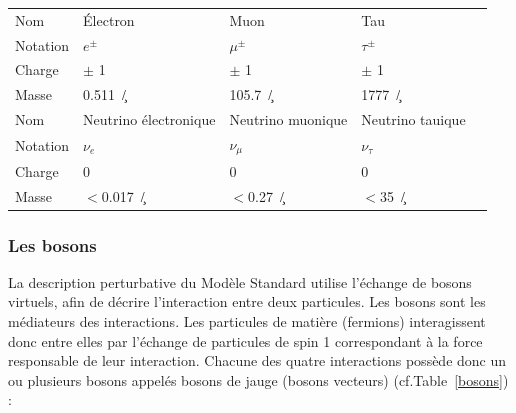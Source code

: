\begin{table}[H]
\begin{tabular}{|O|O|O|O|N}
		\hline
		 Nom &  Électron &  Muon &  Tau \\
		 Notation &  $e^{\pm}$ &  $\mu^{\pm}$ &  $\tau^{\pm}$ \\
		 Charge &  $\pm$ \num{1} &  $\pm$ \num{1} &  $\pm$ \num{1} \\
		 Masse &  \SI{0.511}{\mega\eV/\square\c} &  \SI{105.7}{\mega\eV/\square\c}&  \SI{1777}{\giga\eV/\square\c} \\
		\hline 
		 Nom &  Neutrino électronique &  Neutrino muonique &  Neutrino tauique \\
		 Notation &  $\nu_{e}$ &  $\nu_{\mu}$ &  $\nu_{\tau}$ \\
		 Charge &  \num{0} &  \num{0} &  \num{0} \\
		 Masse &  $<$\SI{0.017}{\mega\eV/\square\c} & $<$\SI{0.27}{\mega\eV/\square\c}  & $<$\SI{35}{\mega\eV/\square\c}\\
	\hline
\end{tabular} 
\label{fermions}
\end{table}	

\subsubsection{Les bosons}
La description perturbative du Modèle Standard utilise l'échange de bosons virtuels, afin de décrire l'interaction entre deux particules. Les bosons sont les médiateurs des interactions. Les particules de matière (fermions) interagissent donc entre elles par l'échange de particules de spin \num{1} correspondant à la force responsable de leur interaction.
\smallskip
Chacune des quatre interactions possède donc un ou plusieurs bosons appelés bosons de jauge (bosons vecteurs) (cf.Table~\ref{bosons}) :

